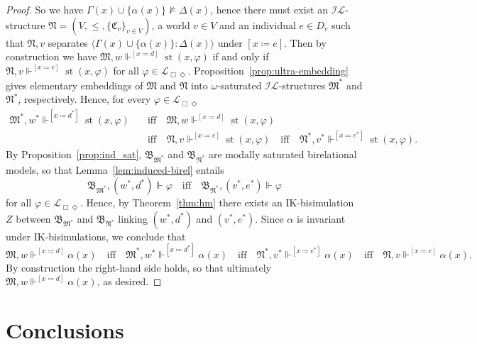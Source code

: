 \documentclass[submission,copyright,creativecommons]{eptcs}
\newcommand{\mo}{\mathfrak}
\newcommand{\B}{\mo{B}}
\newcommand{\Z}{Z}
\renewcommand{\phi}{\varphi}
\renewcommand{\iff}{\quad\text{iff}\quad}
\DeclareMathOperator{\st}{st}
\newcommand{\IL}{\mathscr{I\!\!L}}   %
\newcommand{\ML}{\mathcal{L}_{\Box\Diamond}}        %
\newcommand{\consec}[2]{\langle #1:#2 \rangle}
\newcommand{\satisfySym}{\Vdash}
\newcommand{\satisfy}[4]{#1, #2 \satisfySym^{#4} #3}
\newcommand{\msatisfy}[3]{#1, #2 \Vdash #3}
\begin{document}
\begin{proof}
  So we have $\Gamma(x) \cup \{ \alpha(x) \} \not\models \Delta(x)$,
  hence there must exist an $\IL$-structure $\mo{N} = (V, \leq, \{ \mo{C}_v \}_{v \in V})$,
  a world $v \in V$ and an individual $e \in D_v$ such that 
  $\mo{N}, v$ separates $\consec{\Gamma(x)\cup\{\alpha(x)\}}{\Delta(x)}$ under $[x \coloneq e]$.
  Then by construction we have
  $\satisfy{\mo{M}}{w}{\st(x,\varphi)}{[x \coloneq d]}$ if and only if
  $\satisfy{\mo{N}}{v}{\st(x,\varphi)}{[x \coloneq e]}$ for all $\phi \in \ML$.
  Proposition~\ref{prop:ultra-embedding}
  gives elementary embeddings of $\mo{M}$ and $\mo{N}$ into
  $\omega$-saturated $\IL$-structures $\mo{M}^*$ and $\mo{N}^*$,
  respectively.
  Hence, for every $\phi \in \ML$
  \begin{align*}
    \satisfy{\mo{M}^*}{w^*}{\st(x, \phi)}{[x \coloneq d^*]}
      &\iff \satisfy{\mo{M}}{w}{\st(x, \phi)}{[x \coloneq d]} \\
      &\iff \satisfy{\mo{N}}{v}{\st(x, \phi)}{[x \coloneq e]}
      \iff \satisfy{\mo{N}^*}{v^*}{\st(x,\varphi)}{[x \coloneq e^*]}.
  \end{align*}
  By Proposition~\ref{prop:ind_sat},
  $\B_{\mo{M}^*}$ and $\B_{\mo{N}^*}$ are modally saturated birelational models,
  so that Lemma~\ref{lem:induced-birel} entails
  \begin{equation*}
    \msatisfy{\B_{\mo{M}^*}}{(w^*, d^*)}{\phi}
      \iff \msatisfy{\B_{\mo{N}^*}}{(v^*, e^*)}{\phi}
  \end{equation*}
  for all $\phi \in \ML$. Hence, by Theorem~\ref{thm:hm}
  there exists an IK-bi\-si\-mu\-la\-tion $\Z$ between $\B_{\mo{M}^*}$ and $\B_{\mo{N}^*}$
  linking $(w^*, d^*)$ and $(v^*, e^*)$.
  Since $\alpha$ is invariant under IK-bi\-si\-mu\-la\-tions,
  we conclude that 
  \begin{equation*}
    \satisfy{\mo{M}}{w}{\alpha(x)}{[x \coloneq d]}
      \iff \satisfy{\mo{M}^*}{w^*}{\alpha(x)}{[x \coloneq d^*]}
      \iff \satisfy{\mo{N}^*}{v^*}{\alpha(x)}{[x \coloneq e^*]}
      \iff \satisfy{\mo{N}}{v}{\alpha(x)}{[x \coloneq e]}.
  \end{equation*}
  By construction the right-hand side holds, so that ultimately
  $\satisfy{\mo{M}}{w}{\alpha(x)}{[x \coloneq d]}$, as desired.
\end{proof}



\section{Conclusions}
\end{document}
